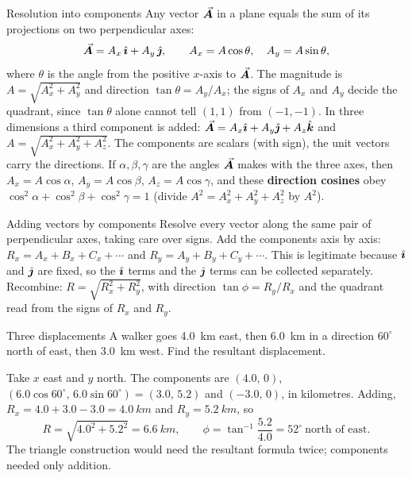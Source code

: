 \begin{defbox}{Resolution into components}
Any vector $\vec{\bm{A}}$ in a plane equals the sum of its projections on two perpendicular axes:
\[
\vec{\bm{A}} = A_x\,\hat{\bm{\imath}} + A_y\,\hat{\bm{\jmath}},\qquad A_x=A\cos\theta,\quad A_y=A\sin\theta,
\]
where $\theta$ is the angle from the positive $x$-axis to $\vec{\bm{A}}$.
The magnitude is $A=\sqrt{A_x^2+A_y^2}$ and direction $\tan\theta=A_y/A_x$; the signs of $A_x$ and $A_y$
decide the quadrant, since $\tan\theta$ alone cannot tell $(1,1)$ from $(-1,-1)$. In three dimensions a
third component is added: $\vec{\bm{A}}=A_x\hat{\bm{\imath}}+A_y\hat{\bm{\jmath}}+A_z\hat{\bm{k}}$ and $A=\sqrt{A_x^2+A_y^2+A_z^2}$. The
components are scalars (with sign), the unit vectors carry the directions. If $\alpha,\beta,\gamma$ are
the angles $\vec{\bm{A}}$ makes with the three axes, then $A_x=A\cos\alpha$, $A_y=A\cos\beta$, $A_z=A\cos\gamma$,
and these \textbf{direction cosines} obey $\cos^2\alpha+\cos^2\beta+\cos^2\gamma=1$ (divide
$A^2=A_x^2+A_y^2+A_z^2$ by $A^2$).
\end{defbox}

\begin{methodbox}{Adding vectors by components}
 Resolve every vector along the same pair of perpendicular axes, taking care over signs.
 Add the components axis by axis: $R_x=A_x+B_x+C_x+\cdots$ and $R_y=A_y+B_y+C_y+\cdots$. This
is legitimate because $\hat{\bm{\imath}}$ and $\hat{\bm{\jmath}}$ are fixed, so the $\hat{\bm{\imath}}$ terms and the $\hat{\bm{\jmath}}$ terms can be
collected separately.
 Recombine: $R=\sqrt{R_x^2+R_y^2}$, with direction $\tan\phi=R_y/R_x$ and the quadrant read
from the signs of $R_x$ and $R_y$.
\end{methodbox}

\begin{exbox}{Three displacements}
A walker goes \SI{4.0}{km} east, then \SI{6.0}{km} in a direction $60^\circ$ north of east, then
\SI{3.0}{km} west. Find the resultant displacement.

Take $x$ east and $y$ north. The components are $(4.0,\,0)$, $(6.0\cos60^\circ,\,6.0\sin60^\circ)=(3.0,\,5.2)$
and $(-3.0,\,0)$, in kilometres. Adding, $R_x=4.0+3.0-3.0=\SI{4.0}{km}$ and $R_y=\SI{5.2}{km}$, so
\[
R=\sqrt{4.0^2+5.2^2}=\SI{6.6}{km},\qquad \phi=\tan^{-1}\frac{5.2}{4.0}=52^\circ\ \text{north of east}.
\]
The triangle construction would need the resultant formula twice; components needed only addition.
\end{exbox}


